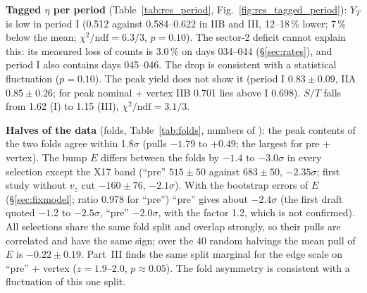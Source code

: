 \documentclass[11pt,a4paper]{article}
\newcommand{\code}[1]{\texttt{\detokenize{#1}}}
\newcommand{\vz}{\ensuremath{v_z}\xspace}
\begin{document}
\textbf{Tagged $\eta$ per period} (Table~\ref{tab:res_period}, Fig.~\ref{fig:res_tagged_period}): $Y_T$ is low in period I (0.512 against 0.584--0.622
in IIB and III, 12--18\,\% lower; 7\,\% below the mean; $\chi^2/\mathrm{ndf}=6.3/3$, $p=0.10$). The sector-2 deficit cannot explain this: its measured
loss of counts is 3.0\,\% on days 034--044 (\S\ref{sec:rates}), and period I also contains days 045--046. The drop is consistent with a statistical
fluctuation ($p=0.10$). The peak yield does not show it (period I $0.83\pm0.09$, IIA $0.85\pm0.26$; for peak nominal + vertex IIB 0.701 lies above
I 0.698). $S/T$ falls from 1.62 (I) to 1.15 (III), $\chi^2/\mathrm{ndf}=3.1/3$.

\textbf{Halves of the data} (folds, Table~\ref{tab:folds}, numbers of \code{opt_named.txt}): the peak contents of the two folds agree within
1.8$\sigma$ (pulls $-1.79$ to $+0.49$; the largest for pre + vertex). The bump $E$ differs between the folds by $-1.4$ to $-3.0\sigma$ in every
selection except the X17 band (``pre'' $515\pm50$ against $683\pm50$, $-2.35\sigma$; first study without $\vz$ cut $-160\pm76$, $-2.1\sigma$).
With the bootstrap errors of $E$ (\S\ref{sec:fixmodel}; ratio 0.978 for ``pre'') ``pre'' gives about $-2.4\sigma$ (the first draft quoted
$-1.2$ to $-2.5\sigma$, ``pre'' $-2.0\sigma$, with the factor 1.2, which is not confirmed). All selections
share the same fold split and overlap strongly, so their pulls are correlated and have the same sign; over the 40 random halvings the mean
pull of $E$ is $-0.22\pm0.19$. Part~III finds the same split marginal for the edge scale on ``pre'' + vertex ($z=1.9$--2.0, $p\approx0.05$).
The fold asymmetry is consistent with a fluctuation of this one split.
\end{document}
